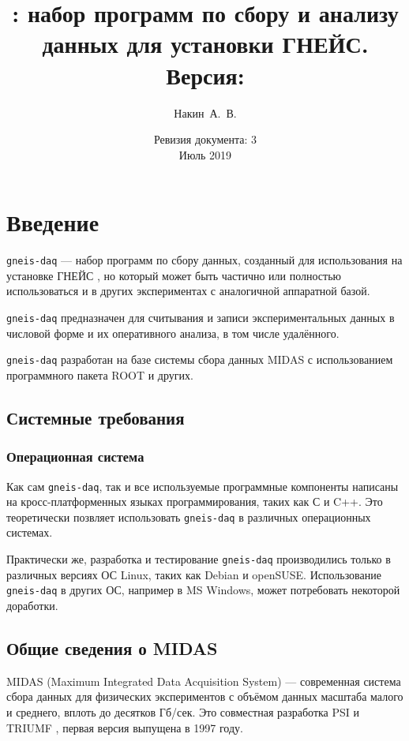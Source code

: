 \documentclass[12pt, a4paper, oneside, onecolumn]{book}
\title{\GD{}: набор программ по сбору и анализу данных для установки ГНЕЙС. \\
Версия: \GDVER
}
\author{Накин~А.~В.}
\date{Ревизия документа: 3\\Июль 2019}
\newcommand{\GD}{{\tt gneis-daq}}
\newcommand{\MIDAS}{\mbox{MIDAS}}
\begin{document}
\maketitle

\tableofcontents

\chapter{Введение}

\GD{} --- набор программ по сбору данных, созданный для использования на установке ГНЕЙС \cite{shcherb2018}, но который может быть частично или полностью  использоваться и в других экспериментах с аналогичной аппаратной базой.

\GD{} предназначен для считывания и записи экспериментальных данных в числовой форме и их оперативного анализа, в том числе удалённого.

\GD{} разработан на базе системы сбора данных \MIDAS{} \cite{midas} с использованием программного пакета ROOT \cite{RootHome} и других.

\section{Системные требования}

\subsection{Операционная система}

Как сам \GD{}, так и все используемые программные компоненты написаны на кросс-платформенных языках программирования, таких как С и C++. Это теоретически позвляет использовать \GD{} в различных операционных системах.

Практически же, разработка и тестирование \GD{} производились только в различных версиях ОС Linux, таких как Debian и openSUSE. Использование \GD{} в других ОС, например в MS Windows, может потребовать некоторой доработки.

\section{Общие сведения о \MIDAS{}}

\MIDAS{} (Maximum Integrated Data Acquisition System) --- современная система сбора данных для физических экспериментов с объёмом данных масштаба малого и среднего, вплоть до десятков Гб/сек. Это совместная разработка PSI \cite{psi} и TRIUMF \cite{triumf}, первая версия выпущена в 1997 году.
\end{document}
